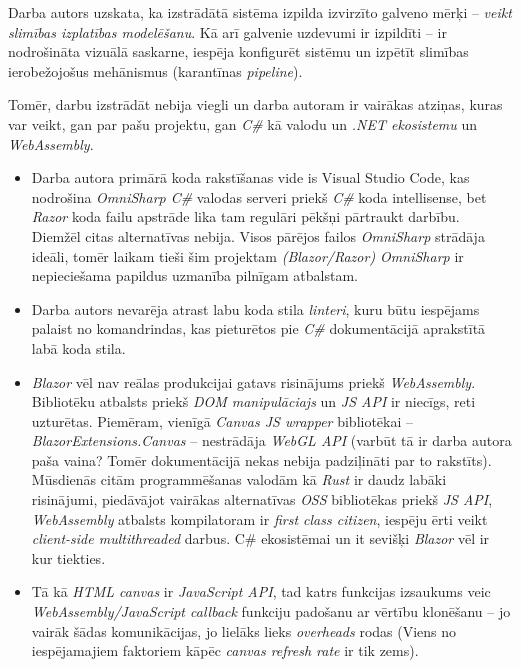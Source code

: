 Darba autors uzskata, ka izstrādātā sistēma izpilda izvirzīto galveno mērķi
-- \emph{veikt slimības izplatības modelēšanu}. Kā arī
galvenie uzdevumi ir izpildīti -- ir nodrošināta vizuālā saskarne, iespēja
konfigurēt sistēmu un izpētīt slimības ierobežojošus mehānismus (karantīnas \emph{pipeline}).

Tomēr, darbu izstrādāt nebija viegli un darba autoram ir vairākas atziņas, kuras
var veikt, gan par pašu projektu, gan \emph{C\#} kā valodu un \emph{.NET ekosistemu} un \emph{WebAssembly}.

\begin{itemize}
    \item Darba autora primārā koda rakstīšanas vide is Visual Studio Code, kas
    nodrošina \emph{OmniSharp C\#} valodas serveri priekš \emph{C\#} koda intellisense,
    bet \emph{Razor} koda
    failu apstrāde lika tam regulāri pēkšņi pārtraukt darbību. Diemžēl citas alternatīvas
    nebija. Visos pārējos failos \emph{OmniSharp} strādāja ideāli, tomēr laikam tieši šim projektam
    \emph{(Blazor/Razor) OmniSharp} ir nepieciešama papildus uzmanība pilnīgam atbalstam.

    \item Darba autors nevarēja atrast labu koda stila \emph{linteri}, kuru būtu iespējams
    palaist no komandrindas, kas pieturētos pie \emph{C\#} dokumentācijā aprakstītā labā koda stila\cite{csharp:code-conventions}.

    \item \emph{Blazor} vēl nav reālas produkcijai gatavs risinājums priekš \emph{WebAssembly}.
    Bibliotēku atbalsts priekš \emph{DOM manipulāciajs} un \emph{JS API} ir niecīgs, reti uzturētas.
    Piemēram, vienīgā \emph{Canvas JS wrapper} bibliotēkai -- \emph{BlazorExtensions.Canvas} --
    nestrādāja \emph{WebGL API} (varbūt tā ir darba autora paša vaina? Tomēr
    dokumentācijā nekas nebija padziļināti par to rakstīts). Mūsdienās citām programmēšanas valodām kā \emph{Rust}
    ir daudz labāki risinājumi, piedāvājot vairākas alternatīvas \emph{OSS}
    bibliotēkas priekš \emph{JS API},
    \emph{WebAssembly} atbalsts kompilatoram ir \emph{first class citizen}, iespēju
    ērti veikt \emph{client-side multithreaded} darbus. C\# ekosistēmai un it
    sevišķi \emph{Blazor} vēl ir kur tiekties.

    \item Tā kā \emph{HTML canvas} ir
    \emph{JavaScript API}, tad katrs funkcijas izsaukums veic \emph{WebAssembly/JavaScript callback}
    funkciju padošanu ar vērtību klonēšanu -- jo vairāk šādas komunikācijas, jo
    lielāks lieks \emph{overheads} rodas (Viens no iespējamajiem faktoriem kāpēc \emph{canvas refresh rate} ir tik zems).


\end{itemize}
